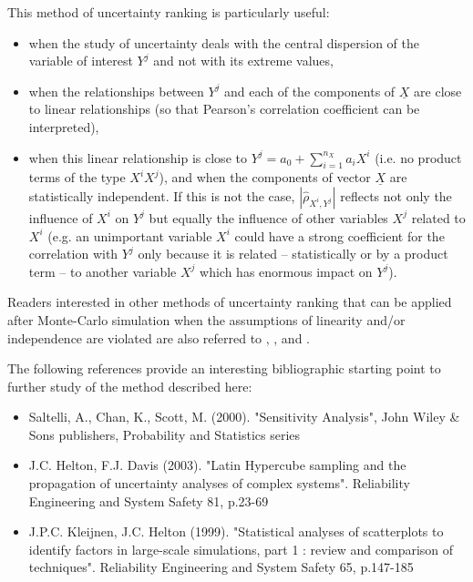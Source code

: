 {
  This method of uncertainty ranking is particularly useful:
  \begin{itemize}
  \item when the study of uncertainty deals with the central dispersion of the variable of interest $Y^j$ and not with its extreme values,
  \item when the relationships between $Y^j$ and each of the components of $\underline{X}$ are close to linear relationships (so that Pearson's correlation coefficient can be interpreted),
  \item when this linear relationship is close to  $Y^j = a_0 + \sum_{i=1}^{n_X} a_i X^i$ (i.e. no product terms of the type $X^i X^j$), and when the components of vector $\underline{X}$ are statistically independent.  If this is not the case, $\left| \widehat{\rho}_{X^i,Y^j} \right|$  reflects not only the influence of $X^i$ on $Y^j$ but equally the influence of  other variables $X^j$ related to $X^i$ (e.g. an unimportant variable $X^i$ could have a strong coefficient for the correlation with $Y^j$ only because it is related -- statistically or by a product term -- to another variable $X^j$ which has enormous impact on $Y^j$).
  \end{itemize}

  Readers interested in other methods of uncertainty ranking that can be applied after Monte-Carlo simulation when the assumptions of linearity and/or independence are violated are also referred to , ,  and .

  The following references provide an interesting bibliographic starting point to further study of the method described here:
  \begin{itemize}
  \item Saltelli, A., Chan, K., Scott, M. (2000). "Sensitivity Analysis", John Wiley \& Sons publishers, Probability and Statistics series
  \item J.C. Helton, F.J. Davis (2003). "Latin Hypercube sampling and the propagation of uncertainty analyses of complex systems". Reliability Engineering and System Safety 81, p.23-69
  \item J.P.C. Kleijnen, J.C. Helton (1999). "Statistical analyses of scatterplots to identify factors in large-scale simulations, part 1 : review and comparison of techniques". Reliability Engineering and System Safety 65, p.147-185
  \end{itemize}
}
